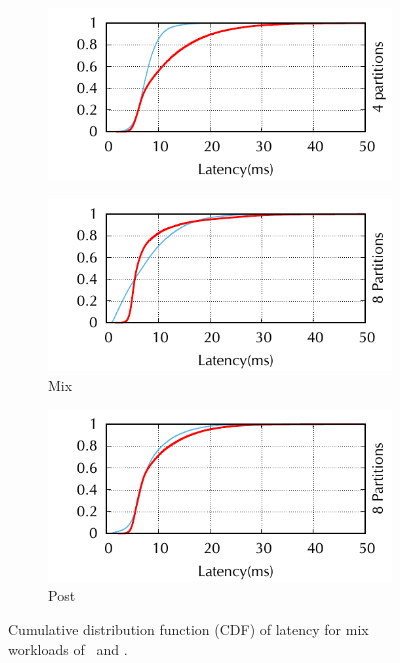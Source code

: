 \begin{figure}[ht!]
\begin{subfigure}{.48\textwidth}
\end{subfigure}
\begin{subfigure}{.48\textwidth}
      \centering
      \includegraphics[width=\textwidth]{./figures/experiments/dssmr/latency-cdf-post-4p}
\end{subfigure}
\begin{subfigure}{.48\textwidth}
      \centering
      \includegraphics[width=\textwidth]{./figures/experiments/dssmr/latency-cdf-mix-8p}
      \caption{Mix}
\end{subfigure}
\begin{subfigure}{.48\textwidth}
      \centering
      \includegraphics[width=\textwidth]{./figures/experiments/dssmr/latency-cdf-post-8p}
      \caption{Post}
\end{subfigure}
\caption{Cumulative distribution function (CDF) of latency for mix workloads of \dssmr\ and \ssmr.}%
\label{fig:dssmr-cdf}
\end{figure}




